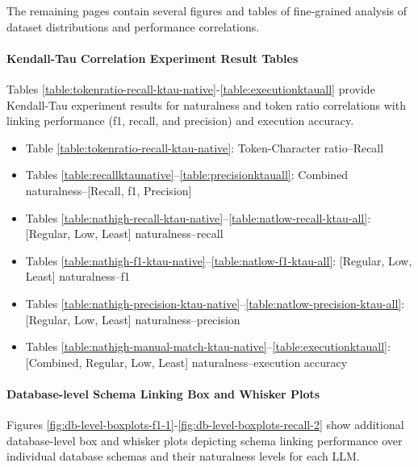 The remaining pages contain several figures and tables of fine-grained analysis of dataset distributions and performance correlations.

\paragraph{Kendall-Tau Correlation Experiment Result Tables}

Tables \ref{table:tokenratio-recall-ktau-native}-\ref{table:executionktauall} provide Kendall-Tau experiment results for naturalness and token ratio correlations with linking performance (f1, recall, and precision) and execution accuracy.

\begin{itemize}
  \item Table \ref{table:tokenratio-recall-ktau-native}: Token-Character ratio--Recall
  \item Tables \ref{table:recallktaunative}--\ref{table:precisionktauall}: Combined naturalness--[Recall, f1, Precision]
  \item Tables \ref{table:nathigh-recall-ktau-native}--\ref{table:natlow-recall-ktau-all}: [Regular, Low, Least] naturalness--recall
  \item Tables \ref{table:nathigh-f1-ktau-native}--\ref{table:natlow-f1-ktau-all}: [Regular, Low, Least] naturalness--f1
  \item Tables \ref{table:nathigh-precision-ktau-native}--\ref{table:natlow-precision-ktau-all}: [Regular, Low, Least] naturalness--precision
  \item Tables \ref{table:nathigh-manual-match-ktau-native}--\ref{table:executionktauall}: [Combined, Regular, Low, Least] naturalness--execution accuracy
\end{itemize}

\paragraph{Database-level Schema Linking Box and Whisker Plots}

Figures \ref{fig:db-level-boxplots-f1-1}-\ref{fig:db-level-boxplots-recall-2} show additional database-level box and whisker plots depicting schema linking performance over individual database schemas and their naturalness levels for each LLM.




